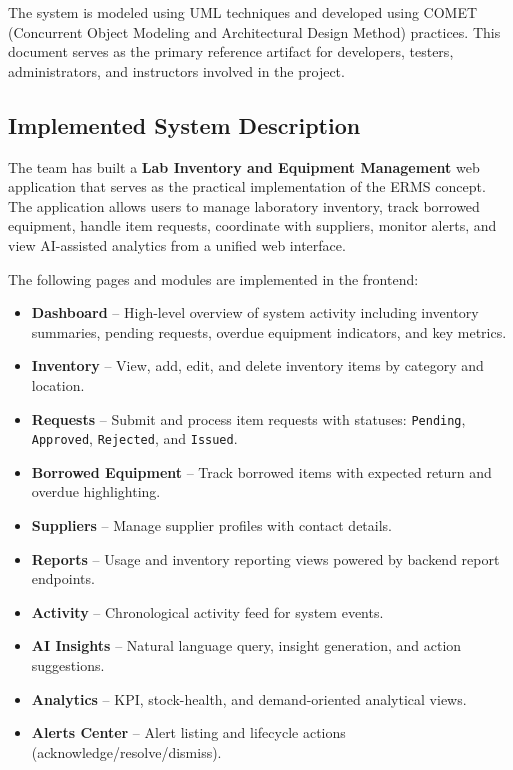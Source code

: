 \documentclass[12pt]{article}
\begin{document}
The system is modeled using UML techniques and developed using COMET (Concurrent Object Modeling and Architectural Design Method) practices. This document serves as the primary reference artifact for developers, testers, administrators, and instructors involved in the project.

\subsection{Implemented System Description}

The team has built a \textbf{Lab Inventory and Equipment Management} web application that serves as the practical implementation of the ERMS concept. The application allows users to manage laboratory inventory, track borrowed equipment, handle item requests, coordinate with suppliers, monitor alerts, and view AI-assisted analytics from a unified web interface.

The following pages and modules are implemented in the frontend:

\begin{itemize}
    \item \textbf{Dashboard} -- High-level overview of system activity including inventory summaries, pending requests, overdue equipment indicators, and key metrics.
    \item \textbf{Inventory} -- View, add, edit, and delete inventory items by category and location.
    \item \textbf{Requests} -- Submit and process item requests with statuses: \texttt{Pending}, \texttt{Approved}, \texttt{Rejected}, and \texttt{Issued}.
    \item \textbf{Borrowed Equipment} -- Track borrowed items with expected return and overdue highlighting.
    \item \textbf{Suppliers} -- Manage supplier profiles with contact details.
    \item \textbf{Reports} -- Usage and inventory reporting views powered by backend report endpoints.
    \item \textbf{Activity} -- Chronological activity feed for system events.
    \item \textbf{AI Insights} -- Natural language query, insight generation, and action suggestions.
    \item \textbf{Analytics} -- KPI, stock-health, and demand-oriented analytical views.
    \item \textbf{Alerts Center} -- Alert listing and lifecycle actions (acknowledge/resolve/dismiss).
\end{itemize}
\end{document}
